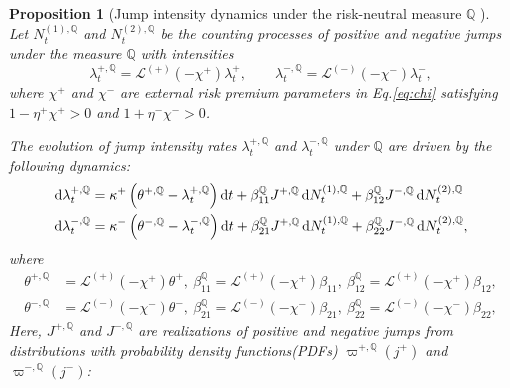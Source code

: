 \documentclass[11pt,a4paper]{article}
\numberwithin{equation}{section}
\newtheorem{proposition}[theorem]{Proposition}
\theoremstyle{remark}
\theoremstyle{definition}
\newcommand{\q}{{\mathbb Q}}
\newcommand{\dd}{{\rm d}}
\begin{document}
\begin{proposition}[Jump intensity dynamics under the risk-neutral measure $\q$ ]\label{prop:HawkesUnderQ}  %
    Let
    $N^{(1),\mathbb{Q}}_t$ and $N^{(2),\mathbb{Q}}_t$ be the counting processes of positive and negative jumps under the measure $\mathbb{Q}$ with intensities
    \begin{equation}
        \lambda^{+,\mathbb{Q}}_t=\mathcal{L}^{(+)}\left(-\chi^+\right) \lambda^+_t,\qquad
        \lambda^{-,\mathbb{Q}}_t=\mathcal{L}^{(-)}\left(-\chi^-\right) \lambda^-_t,
    \end{equation}
    where $\chi^+$ and $\chi^-$ are external risk premium parameters in Eq.\eqref{eq:chi} satisfying
  $1 - \eta^+ \chi^+>0$ and $1 + \eta^-\chi^->0$.

The evolution of jump intensity rates  $\lambda^{+,\mathbb{Q}}_t$ and $\lambda^{-,\mathbb{Q}}_t$ under $\mathbb{Q}$ are driven by the following dynamics:
    \begin{equation}\label{eq:dxi}
\begin{split}
   \dd \lambda^{+,\mathbb{Q}}_t &= \kappa^+ \left(\theta^{+, \mathbb{Q}}-\lambda^{+,\mathbb{Q}}_t\right)\dd t
         + \beta^{\mathbb{Q}}_{11} J^{+, \mathbb{Q}}\, \dd N^{(1),\mathbb{Q}}_t
         + \beta^{ \mathbb{Q}}_{12} J^{-, \mathbb{Q}}\, \dd N^{(2),\mathbb{Q}}_t\\
   \dd \lambda^{-,\mathbb{Q}}_t &= \kappa^- \left(\theta^{-, \mathbb{Q}}-\lambda^{-,\mathbb{Q}}_t\right)\dd t
         + \beta^{\mathbb{Q}}_{21} J^{+, \mathbb{Q}} \,\dd N^{(1),\mathbb{Q}}_t
         + \beta^{\mathbb{Q}}_{22} J^{-, \mathbb{Q}} \,\dd N^{(2),\mathbb{Q}}_t,
\end{split}
\end{equation}
    where
    \begin{align}
         \theta^{+, \mathbb{Q}} &= \mathcal{L}^{(+)}(-\chi^+)\theta^+,\
         \beta^{\mathbb{Q}}_{11} = \mathcal{L}^{(+)}(-\chi^+)\beta_{11},\
         \beta^{\mathbb{Q}}_{12} = \mathcal{L}^{(+)}(-\chi^+)\beta_{12},\\
         \theta^{-,\mathbb{Q}} &= \mathcal{L}^{(-)}(-\chi^-)\theta^-,\
         \beta^{\mathbb{Q}}_{21} = \mathcal{L}^{(-)}(-\chi^-)\beta_{21},\
         \beta^{\mathbb{Q}}_{22} = \mathcal{L}^{(-)}(-\chi^-)\beta_{22},
    \end{align}
    Here, $J^{+, \mathbb{Q}}$ and  $J^{-, \mathbb{Q}}$ are realizations of positive and negative jumps from distributions with probability density functions(PDFs)
    $\varpi^{+, \mathbb{Q}}(j^+)$ and $\varpi^{-, \mathbb{Q}}(j^-)$:

\end{proposition}
\end{document}
